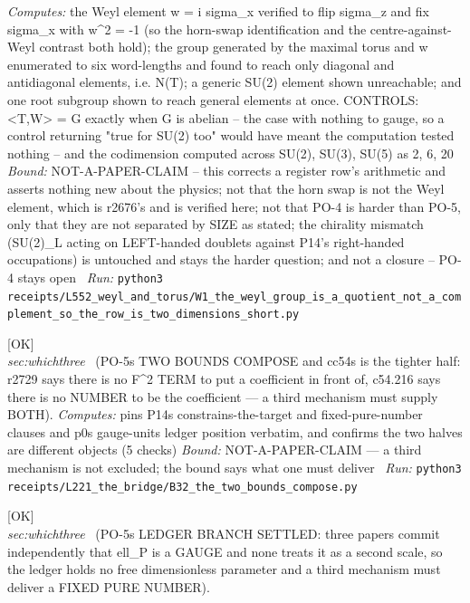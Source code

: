 \begin{description}
\emph{Computes:} the Weyl element w = i sigma\_x verified to flip sigma\_z and fix sigma\_x with w\textasciicircum{}2 = -1 (so the horn-swap identification and the centre-against-Weyl contrast both hold); the group generated by the maximal torus and w enumerated to six word-lengths and found to reach only diagonal and antidiagonal elements, i.e. N(T); a generic SU(2) element shown unreachable; and one root subgroup shown to reach general elements at once. CONTROLS: <T,W> = G exactly when G is abelian -- the case with nothing to gauge, so a control returning "true for SU(2) too" would have meant the computation tested nothing -- and the codimension computed across SU(2), SU(3), SU(5) as 2, 6, 20
 \emph{Bound:} NOT-A-PAPER-CLAIM -- this corrects a register row's arithmetic and asserts nothing new about the physics; not that the horn swap is not the Weyl element, which is r2676's and is verified here; not that PO-4 is harder than PO-5, only that they are not separated by SIZE as stated; the chirality mismatch (SU(2)\_L acting on LEFT-handed doublets against P14's right-handed occupations) is untouched and stays the harder question; and not a closure -- PO-4 stays open
\ \emph{Run:} \texttt{python3 receipts/L552\_weyl\_and\_torus/W1\_the\_weyl\_group\_is\_a\_quotient\_not\_a\_complement\_so\_the\_row\_is\_two\_dimensions\_short.py}
\item[\label{rcpt:B32_the_two_bounds_compose}\texttt{B32\_the\_two\_bounds\_compose}]\hfill\textsf{[OK]}\\
\textit{sec:whichthree} \ (PO-5s TWO BOUNDS COMPOSE and cc54s is the tighter half: r2729 says there is no F\textasciicircum{}2 TERM to put a coefficient in front of, c54.216 says there is no NUMBER to be the coefficient --- a third mechanism must supply BOTH). 
\emph{Computes:} pins P14s constrains-the-target and fixed-pure-number clauses and p0s gauge-units ledger position verbatim, and confirms the two halves are different objects (5 checks)
 \emph{Bound:} NOT-A-PAPER-CLAIM --- a third mechanism is not excluded; the bound says what one must deliver
\ \emph{Run:} \texttt{python3 receipts/L221\_the\_bridge/B32\_the\_two\_bounds\_compose.py}
\item[\label{rcpt:B33_the_ledger_branch_is_settled}\texttt{B33\_the\_ledger\_branch\_is\_settled}]\hfill\textsf{[OK]}\\
\textit{sec:whichthree} \ (PO-5s LEDGER BRANCH SETTLED: three papers commit independently that ell\_P is a GAUGE and none treats it as a second scale, so the ledger holds no free dimensionless parameter and a third mechanism must deliver a FIXED PURE NUMBER). 

\end{description}
